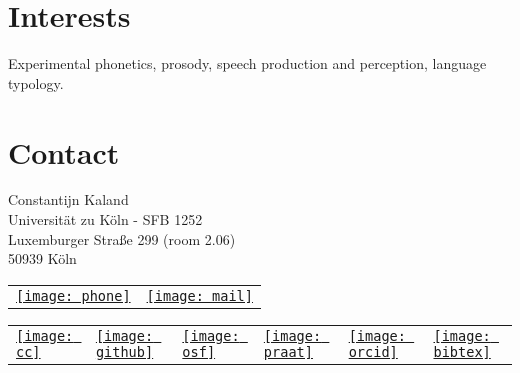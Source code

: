 \documentclass[a4paper,11pt]{article}
\begin{document}
\section*{Interests}
Experimental phonetics, prosody, speech production and perception, language typology.\\

\section*{Contact}
Constantijn Kaland\\
Universit{\"a}t zu K{\"o}ln - SFB 1252\\
Luxemburger Stra{\ss}e 299 (room 2.06)\\
50939 K{\"o}ln
\begin{table}[ht!]
\begin{tabular}{m{1.2cm}m{1.2cm}}
\href{tel:+4922147089909}{\texttt{[image: phone]}}& \href{mailto:c.c.l.kaland@outlook.com}{\texttt{[image: mail]}}
\end{tabular}
\end{table}
\vspace{12mm}

\begin{table}[ht!]
\begin{center}
\begin{tabular}{m{2.2cm}m{1.8cm}m{1.8cm}m{1.8cm}m{1.8cm}m{1.8cm}} 
\href{http://constantijnkaland.github.io/contourclustering/}{\texttt{[image: cc]}}& \href{https://constantijnkaland.github.io/}{\texttt{[image: github]}} & \href{https://osf.io/nhgba}{\texttt{[image: osf]}} & \href{https://doi.org/10.17605/OSF.IO/CR4VN}{\texttt{[image: praat]}}& \href{https://orcid.org/0000-0002-1813-5902}{\texttt{[image: orcid]}} & \href{https://constantijnkaland.github.io/publications_CK.bib}{\texttt{[image: bibtex]}}
\end{tabular}
\end{center}
\end{table}

\newpage
\section*{}
\end{document}
